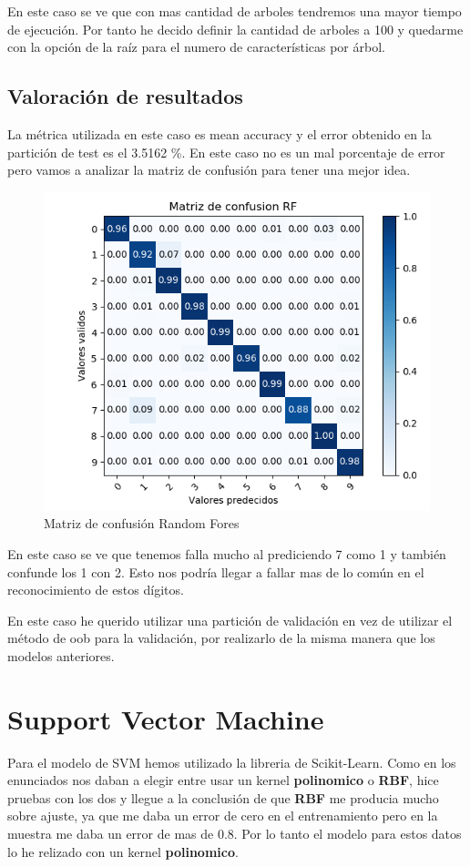 \documentclass[12pt,a4paper]{article}
\begin{document}
En este caso se ve que con mas cantidad de arboles tendremos una mayor tiempo de ejecución. Por tanto he decido definir la cantidad de arboles a 100 y quedarme con la opción de la raíz para el numero de características por árbol.


\subsection{Valoración de resultados}
La métrica utilizada en este caso es mean accuracy y el error obtenido en la partición de test es el 3.5162 \%. En este caso no es un mal porcentaje de error pero vamos a analizar la matriz de confusión para tener una mejor idea.

\begin{figure}[H]
	\centering
	\includegraphics[width=0.7\linewidth]{../imagenesRF/matrizConfusion}
	\caption[Matriz de confusión Random Forest]{Matriz de confusión Random Fores}
	\label{fig:MatrizDeConfusionRF}
\end{figure}

En este caso se ve que tenemos falla mucho al prediciendo 7 como 1 y también confunde los 1 con 2. Esto nos podría llegar a fallar mas de lo común en el reconocimiento de estos dígitos.

En este caso he querido utilizar una partición de validación en vez de utilizar el método de oob para la validación, por realizarlo de la misma manera que los modelos anteriores.

\section{Support Vector Machine}
Para el modelo de SVM hemos utilizado la libreria de Scikit-Learn. Como en los enunciados nos daban a elegir entre usar un kernel \textbf{polinomico} o \textbf{RBF}, hice pruebas con los dos y llegue a la conclusión de que \textbf{RBF} me producia mucho sobre ajuste, ya que me daba un error de cero en el entrenamiento pero en la muestra me daba un error de mas de $0.8$. Por lo tanto el modelo para estos datos lo he relizado con un kernel \textbf{polinomico}.
\end{document}
